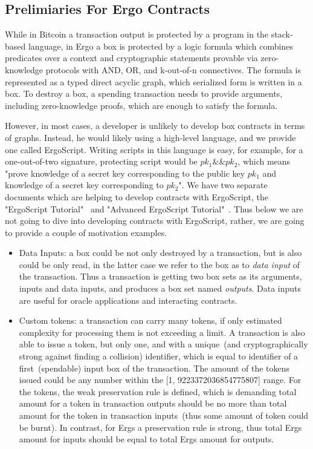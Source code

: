 \subsection{Prelimiaries For Ergo Contracts}

  While in Bitcoin a transaction output is protected by a program in the stack-based language, in Ergo a
 box is protected by a logic formula which combines predicates over a context and cryptographic statements provable
 via zero-knowledge protocols with AND, OR, and k-out-of-n connectives. The formula is represented as a typed direct
 acyclic graph, which serialized form is written in a box. To destroy a box, a spending transaction needs to provide
 arguments, including zero-knowledge proofs, which are enough to satisfy the formula.

 However, in most cases, a developer is unlikely to develop box contracts in terms of graphs. Instead, he would likely
 using a high-level language, and we provide one called ErgoScript. Writing scripts in this language is easy, for
 example, for a one-out-of-two signature, protecting script would be ${pk_1 \&\& pk_2}$, which means "prove knowledge of
 a secret key corresponding to the public key $pk_1$ and knowledge of a secret key corresponding to $pk_2$". We have
 two separate documents which are helping to develop contracts with ErgoScript, the "ErgoScript Tutorial"~\cite{ergoTutorial}
 and "Advanced ErgoScript Tutorial"~\cite{ergoAdvTutorial}. Thus below we are not going to dive into developing contracts with
 ErgoScript, rather, we are going to provide a couple of motivation examples.

 \begin{itemize}
    \item{Data Inputs: }
 a box could be not only destroyed by a transaction, but is also could be only read, in the latter case we refer to the
 box as to {\em data input} of the transaction. Thus a transaction is getting two box sets as its arguments, inputs and
 data inputs, and produces a box set named {\em outputs}. Data inputs are useful for oracle applications and interacting
 contracts.

    \item{Custom tokens: }
 a transaction can carry many tokens, if only estimated complexity for processing them is not exceeding a limit. A
 transaction is also able to issue a token, but only one, and with a unique~(and cryptographically strong against
 finding a collision) identifier, which is equal to identifier of a first~(spendable) input box of the transaction.
 The amount of the tokens issued could be any number within the [1, 9223372036854775807] range. For the tokens, the weak
 preservation rule is defined, which is demanding total amount for a token in transaction outputs should be no more
 than total amount for the token in transaction inputs~(thus some amount of token could be burnt). In contrast, for Ergs
 a preservation rule is strong, thus total Ergs amount for inputs should be equal to total Ergs amount for outputs.
 \end{itemize}

